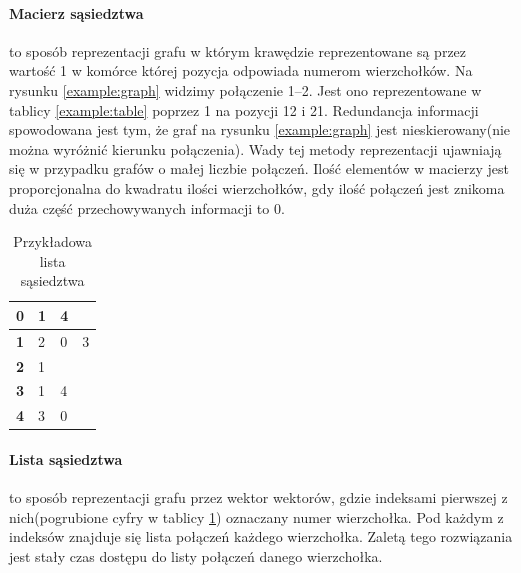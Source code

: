 \documentclass{classrep}
\begin{document}
\paragraph{Macierz sąsiedztwa}
to sposób reprezentacji grafu w którym krawędzie reprezentowane są przez wartość 1 w komórce której pozycja odpowiada numerom wierzchołków.
Na rysunku \ref{example:graph} widzimy połączenie 1--2. Jest ono reprezentowane w tablicy \ref{example:table} poprzez 1 na pozycji 12 i 21.
Redundancja informacji spowodowana jest tym, że graf na rysunku \ref{example:graph} jest nieskierowany(nie można wyróżnić kierunku połączenia). 
Wady tej metody reprezentacji ujawniają się w przypadku grafów o małej liczbie połączeń. 
Ilość elementów w macierzy jest proporcjonalna do kwadratu ilości wierzchołków, gdy ilość połączeń jest znikoma duża część przechowywanych informacji to 0.


\begin{table}[H]
    \centering
    \begin{tabular}{|l|l|ll}
    \cline{1-3}
    \textbf{0} & 1 & \multicolumn{1}{l|}{4} &  \\ \hline
    \textbf{1} & 2 & \multicolumn{1}{l|}{0} & \multicolumn{1}{l|}{3} \\ \hline
    \textbf{2} & 1 &  &  \\ \cline{1-3}
    \textbf{3} & 1 & \multicolumn{1}{l|}{4} &  \\ \cline{1-3}
    \textbf{4} & 3 & \multicolumn{1}{l|}{0} &  \\ \cline{1-3}
    \end{tabular}
    \caption{Przykładowa lista sąsiedztwa}
    \label{example:list}
    \end{table}
\paragraph{Lista sąsiedztwa}
to sposób reprezentacji grafu przez wektor wektorów, gdzie indeksami pierwszej z nich(pogrubione cyfry w tablicy \ref{example:list}) oznaczany numer wierzchołka.
Pod każdym z indeksów znajduje się lista połączeń każdego wierzchołka. Zaletą tego rozwiązania jest stały czas dostępu do listy połączeń danego wierzchołka.
\end{document}

